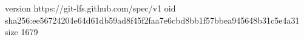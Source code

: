 version https://git-lfs.github.com/spec/v1
oid sha256:ee56724204e64d61db59ad8f45f2faa7e6cbd8bb1f57bbea945648b31c5e4a31
size 1679
